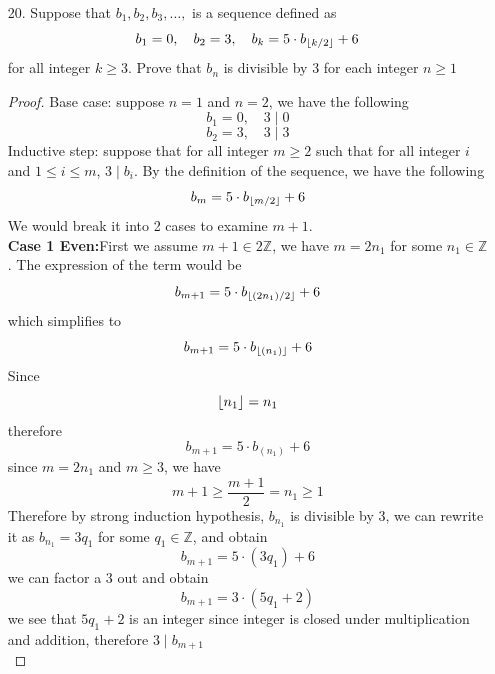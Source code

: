 \documentclass[12pt]{article}
\newcommand{\Z}{\mathbb{Z}}
\newcommand{\paren}[1]{\left( #1 \right)}
\DeclarePairedDelimiter\floor{\lfloor}{\rfloor}
\begin{document}
\begin{enumerate}
\begin{enumerate}
            \item[20.] Suppose that $b_1,b_2,b_3,\ldots,$ is a sequence defined as
                \[
                b_1 = 0, \quad b_2 = 3, \quad b_k=5\cdot b_{\floor{k/2}} + 6
                \]
                for all integer $k \geq 3$. Prove that $b_n$ is divisible by 3 for each integer $n \geq 1$
                \begin{proof}
                    Base case: suppose $n=1$ and $n=2$, we have the following
                        \[
                        b_1 = 0, \quad 3 \mid 0
                        \]
                        \[
                        b_2 = 3, \quad 3 \mid 3
                        \]
                    Inductive step: suppose that for all integer $m \geq 2$ such that for all integer $i$ and $1 \leq i \leq m$, $3 \mid b_i$. By the definition of the sequence, we have the following
                        \[
                        b_{m}=5\cdot b_{\floor{m/2}} + 6
                        \]
                    We would break it into 2 cases to examine $m+1$. \\
                    \textbf{Case 1 Even:}First we assume $m+1 \in 2\Z$, we have $m = 2n_1$ for some $n_1 \in \Z$. The expression of the term would be
                        \[
                        b_{m+1}=5 \cdot b_{\floor{\paren{2n_1}/2}} + 6
                        \]
                    which simplifies to
                        \[
                        b_{m+1}=5 \cdot b_{\floor{\paren{n_1}}} + 6
                        \]
                    Since
                        \[
                        \floor{n_1} = n_1
                        \]
                    therefore
                        \[
                        b_{m+1}=5 \cdot b_{\paren{n_1}} + 6
                        \]
                    since $m = 2n_1$ and $m \geq 3$, we have
                        \[
                        m+1 \geq \frac{m+1}{2} = n_1 \geq 1
                        \]
                    Therefore by strong induction hypothesis, $b_{n_1}$ is divisible by 3, we can rewrite it as $b_{n_1} = 3q_1$ for some $q_1 \in \Z$, and obtain
                        \[
                        b_{m+1}=5 \cdot \paren{3q_1} + 6
                        \]
                    we can factor a 3 out and obtain   
                        \[
                        b_{m+1} = 3\cdot \paren{5q_1 + 2}
                        \]
                    we see that $5q_1 +2$ is an integer since integer is closed under multiplication and addition, therefore $3 \mid b_{m+1}$\\

\end{proof}
\end{enumerate}
\end{enumerate}
\end{document}
